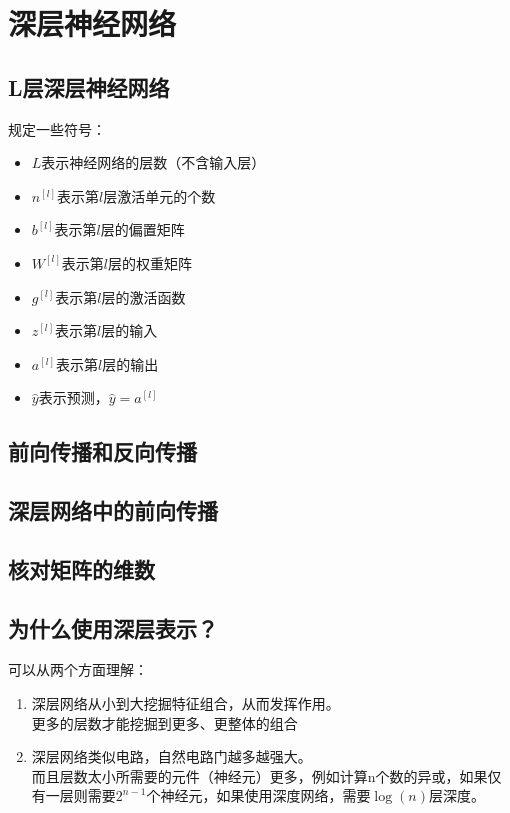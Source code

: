 \documentclass[../../main.tex]{subfiles}
\begin{document}
\chapter{深层神经网络}
\section{L层深层神经网络}
规定一些符号：
\begin{itemize}
    \item \(L\)表示神经网络的层数（不含输入层）
    \item \(n^{[l]}\)表示第\(l\)层激活单元的个数
    \item \(b^{[l]}\)表示第\(l\)层的偏置矩阵
    \item \(W^{[l]}\)表示第\(l\)层的权重矩阵
    \item \(g^{[l]}\)表示第\(l\)层的激活函数
    \item \(z^{[l]}\)表示第\(l\)层的输入
    \item \(a^{[l]}\)表示第\(l\)层的输出
    \item \(\hat{y}\)表示预测，\(\hat{y}=a^{[l]}\)
\end{itemize}
\section{前向传播和反向传播}

\section{深层网络中的前向传播}

\section{核对矩阵的维数}

\section{为什么使用深层表示？}
可以从两个方面理解：
\begin{enumerate}
    \item 深层网络从小到大挖掘特征组合，从而发挥作用。\\更多的层数才能挖掘到更多、更整体的组合
    \item 深层网络类似电路，自然电路门越多越强大。\\而且层数太小所需要的元件（神经元）更多，例如计算n个数的异或，如果仅有一层则需要\(2^{n-1}\)个神经元，如果使用深度网络，需要\(\log(n)\)层深度。
\end{enumerate}
\end{document}

